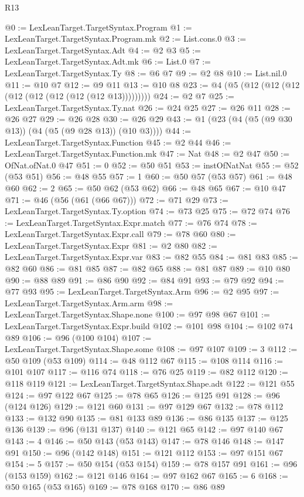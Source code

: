 \begin{lexlean}{R13}
\begin{coremodule}
@0 := LexLeanTarget.TargetSyntax.Program
@1 := LexLeanTarget.TargetSyntax.Program.mk
@2 := List.cons.{0}
@3 := LexLeanTarget.TargetSyntax.Adt
@4 := @2 @3
@5 := LexLeanTarget.TargetSyntax.Adt.mk
@6 := List.{0}
@7 := LexLeanTarget.TargetSyntax.Ty
@8 := @6 @7
@9 := @2 @8
@10 := List.nil.{0}
@11 := @10 @7
@12 := @9 @11
@13 := @10 @8
@23 := @4 (@5 (@12 (@12 (@12 (@12 (@12 (@12 (@12 (@12 @13)))))))))
@24 := @2 @7
@25 := LexLeanTarget.TargetSyntax.Ty.nat
@26 := @24 @25
@27 := @26 @11
@28 := @26 @27
@29 := @26 @28
@30 := @26 @29
@43 := @1 (@23 (@4 (@5 (@9 @30 @13)) (@4 (@5 (@9 @28 @13)) (@10 @3))))
@44 := LexLeanTarget.TargetSyntax.Function
@45 := @2 @44
@46 := LexLeanTarget.TargetSyntax.Function.mk
@47 := Nat
@48 := @2 @47
@50 := OfNat.ofNat.{0} @47
@51 := 0
@52 := @50 @51
@53 := instOfNatNat
@55 := @52 (@53 @51)
@56 := @48 @55
@57 := 1
@60 := @50 @57 (@53 @57)
@61 := @48 @60
@62 := 2
@65 := @50 @62 (@53 @62)
@66 := @48 @65
@67 := @10 @47
@71 := @46 (@56 (@61 (@66 @67)))
@72 := @71 @29
@73 := LexLeanTarget.TargetSyntax.Ty.option
@74 := @73 @25
@75 := @72 @74
@76 := LexLeanTarget.TargetSyntax.Expr.match
@77 := @76 @74
@78 := LexLeanTarget.TargetSyntax.Expr.call
@79 := @78 @60
@80 := LexLeanTarget.TargetSyntax.Expr
@81 := @2 @80
@82 := LexLeanTarget.TargetSyntax.Expr.var
@83 := @82 @55
@84 := @81 @83
@85 := @82 @60
@86 := @81 @85
@87 := @82 @65
@88 := @81 @87
@89 := @10 @80
@90 := @88 @89
@91 := @86 @90
@92 := @84 @91
@93 := @79 @92
@94 := @77 @93
@95 := LexLeanTarget.TargetSyntax.Arm
@96 := @2 @95
@97 := LexLeanTarget.TargetSyntax.Arm.arm
@98 := LexLeanTarget.TargetSyntax.Shape.none
@100 := @97 @98 @67
@101 := LexLeanTarget.TargetSyntax.Expr.build
@102 := @101 @98
@104 := @102 @74 @89
@106 := @96 (@100 @104)
@107 := LexLeanTarget.TargetSyntax.Shape.some
@108 := @97 @107
@109 := 3
@112 := @50 @109 (@53 @109)
@114 := @48 @112 @67
@115 := @108 @114
@116 := @101 @107
@117 := @116 @74
@118 := @76 @25
@119 := @82 @112
@120 := @118 @119
@121 := LexLeanTarget.TargetSyntax.Shape.adt
@122 := @121 @55
@124 := @97 @122 @67
@125 := @78 @65
@126 := @125 @91
@128 := @96 (@124 @126)
@129 := @121 @60
@131 := @97 @129 @67
@132 := @78 @112
@133 := @132 @90
@135 := @81 @133 @89
@136 := @86 @135
@137 := @125 @136
@139 := @96 (@131 @137)
@140 := @121 @65
@142 := @97 @140 @67
@143 := 4
@146 := @50 @143 (@53 @143)
@147 := @78 @146
@148 := @147 @91
@150 := @96 (@142 @148)
@151 := @121 @112
@153 := @97 @151 @67
@154 := 5
@157 := @50 @154 (@53 @154)
@159 := @78 @157 @91
@161 := @96 (@153 @159)
@162 := @121 @146
@164 := @97 @162 @67
@165 := 6
@168 := @50 @165 (@53 @165)
@169 := @78 @168
@170 := @86 @89

\end{coremodule}
\end{lexlean}
